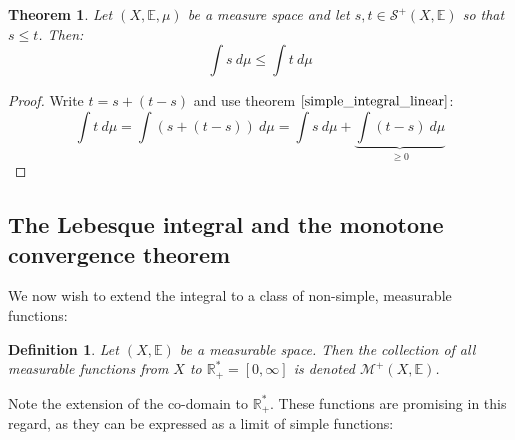 \documentclass[12pt, a4paper]{article}
\newtheorem{theorem}{Theorem}[section]
\newtheorem{definition}{Definition}[section]
\numberwithin{equation}{section}
\begin{document}
\begin{theorem}
\label{simple_integral_ineq}
Let $(X,\mathbb{E},\mu)$ be a measure space and let $s, t\in\mathcal{S}^+(X,\mathbb{E})$ so that $s\le t$. Then:
\begin{equation}
\int s\ d\mu\le\int t\ d\mu
\end{equation}
\end{theorem}
\begin{proof}
Write $t=s+(t-s)$ and use theorem $\ref{simple_integral_linear}$:
\begin{equation}
\int t\ d\mu=\int (s+(t-s))\ d\mu=\int s\ d\mu+\underbrace{\int (t-s)\ d\mu}_{\ge 0}
\end{equation}
\end{proof}

\subsection{The Lebesque integral and the monotone convergence theorem}

We now wish to extend the integral to a class of non-simple, measurable functions:

\begin{definition}
Let $(X,\mathbb{E})$ be a measurable space. Then the collection of all measurable functions from $X$ to $\mathbb{R}^*_+=[0,\infty]$ is denoted $\mathcal{M}^+(X,\mathbb{E})$.
\end{definition}

Note the extension of the co-domain to $\mathbb{R}^*_+$. These functions are promising in this regard, as they can be expressed as a limit of simple functions:
\end{document}
